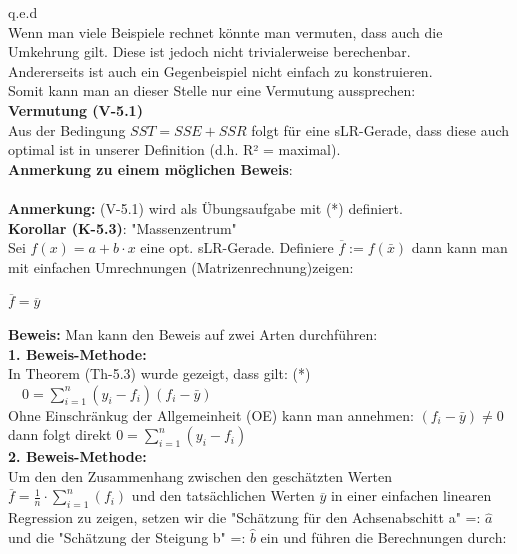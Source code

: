 \documentclass[12pt]{article}
\begin{document}
q.e.d \\[0.7cm]
%
Wenn man viele Beispiele rechnet könnte man vermuten, dass auch die Umkehrung gilt. Diese ist jedoch nicht trivialerweise berechenbar.\\ Andererseits ist auch ein Gegenbeispiel nicht einfach zu konstruieren.\\  Somit kann man an dieser Stelle nur eine Vermutung aussprechen: \\[0.2cm]
%
% 
\textbf{Vermutung (V-5.1)}\\[0.2cm]
Aus der Bedingung $ SST = SSE + SSR $ folgt für eine sLR-Gerade, dass diese auch optimal ist in unserer Definition (d.h. R² = maximal).\\[0.2cm] 
%
\textbf{Anmerkung zu einem möglichen Beweis}:\\ 
%
{\color{red}{Kann zur Zeit noch nicht bewiesen werden.\\
Auch ein Gegenbeispiel ist nicht trivial konstruierbar.\\
Somit bleibt diese Frage offen, bis ein Beweis gefunden ist.}}\\[0.3
cm]
%
\textbf{Anmerkung:} (V-5.1) wird als Übungsaufgabe mit (*) definiert.\\[0.4cm]
\textbf{Korollar (K-5.3)}: "Massenzentrum" \\
Sei $ f(x) =  a + b \cdot x $ eine opt. sLR-Gerade. Definiere $\overline{f} := f(\bar{x})$ dann kann man mit einfachen Umrechnungen (Matrizenrechnung)zeigen: 
\begin{large}
\begin{center}
$ \overline{f} = \overline{y} $ \\
\end{center} 
\end{large}
%
\textbf{Beweis:} Man kann den Beweis auf zwei Arten durchführen:\\
\textbf{1. Beweis-Methode:}\\
In Theorem (Th-5.3) wurde gezeigt, dass gilt: (*) $ \quad 0 = \sum_{i=1}^{n} (y_i - f_i)(f_i - \bar{y})$ \\
Ohne Einschränkug der Allgemeinheit (OE) kann man annehmen: $(f_i - \bar{y}) \neq 0 $ \\ dann folgt direkt $0 = \sum_{i=1}^{n} (y_i - f_i)$ \\
\textbf{2. Beweis-Methode:}\\
Um den den Zusammenhang zwischen den geschätzten Werten $ \overline{f} = \frac{1}{n} \cdot \sum_{i=1}^{n} (f_i)$ und den tatsächlichen Werten $ \overline{y} $ in einer einfachen linearen Regression zu zeigen, setzen wir die "Schätzung für den Achsenabschitt a"  =: $ \hat{a} $ und die "Schätzung der Steigung b" =: $ \hat{b} $ ein und führen die Berechnungen durch:
\end{document}
